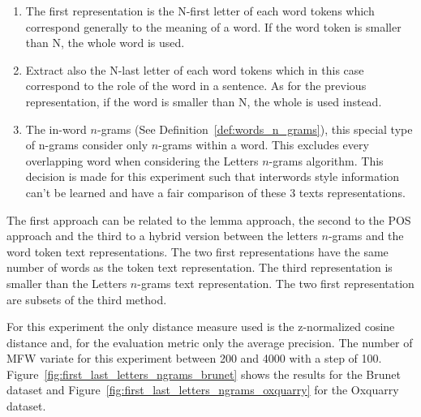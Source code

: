 \begin{enumerate}
  \item
  The first representation is the N-first letter of each word tokens which correspond generally to the meaning of a word.
  If the word token is smaller than N, the whole word is used.
  \item
  Extract also the N-last letter of each word tokens which in this case correspond to the role of the word in a sentence.
  As for the previous representation, if the word is smaller than N, the whole is used instead.
  \item
  The in-word $n$-grams (See Definition~\ref{def:words_n_grams}), this special type of n-grams consider only $n$-grams within a word.
  This excludes every overlapping word when considering the Letters $n$-grams algorithm.
  This decision is made for this experiment such that interwords style information can't be learned and have a fair comparison of these 3 texts representations.
\end{enumerate}

The first approach can be related to the lemma approach, the second to the POS approach and the third to a hybrid version between the letters $n$-grams and the word token text representations.
The two first representations have the same number of words as the token text representation.
The third representation is smaller than the Letters $n$-grams text representation.
The two first representation are subsets of the third method.

For this experiment the only distance measure used is the z-normalized cosine distance and, for the evaluation metric only the average precision.
The number of MFW variate for this experiment between 200 and 4000 with a step of 100.
Figure~\ref{fig:first_last_letters_ngrams_brunet} shows the results for the Brunet dataset and Figure~\ref{fig:first_last_letters_ngrams_oxquarry} for the Oxquarry dataset.

